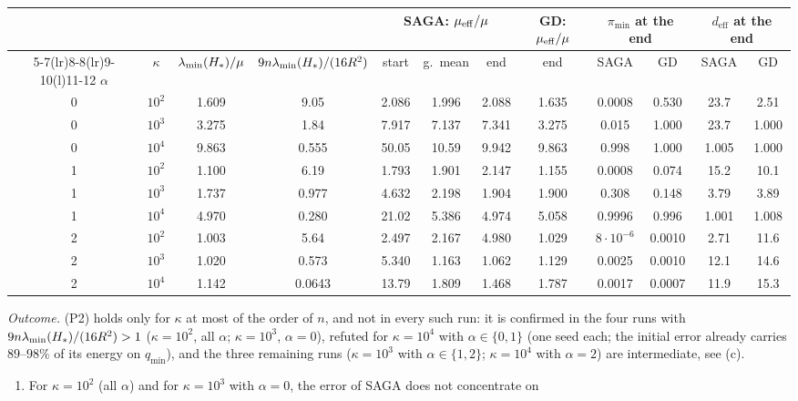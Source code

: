 \begin{remark}
\begin{center}
\footnotesize
\setlength{\tabcolsep}{4pt}
\begin{tabular}{@{}cccccccccccc@{}}
\toprule
 & & & & \multicolumn{3}{c}{SAGA: $\mu_{\mathrm{eff}}/\mu$} & GD: $\mu_{\mathrm{eff}}/\mu$ & \multicolumn{2}{c}{$\pi_{\min}$ at the end} & \multicolumn{2}{c}{$d_{\mathrm{eff}}$ at the end}\\
\cmidrule(lr){5-7}\cmidrule(lr){8-8}\cmidrule(lr){9-10}\cmidrule(l){11-12}
$\alpha$ & $\kappa$ & $\lambda_{\min}(H_\ast)/\mu$ & $9n\lambda_{\min}(H_\ast)/(16R^2)$ & start & g.\ mean & end & end & SAGA & GD & SAGA & GD\\
\midrule
0 & $10^2$ & 1.609 & 9.05 & 2.086 & 1.996 & 2.088 & 1.635 & 0.0008 & 0.530 & 23.7 & 2.51\\
0 & $10^3$ & 3.275 & 1.84 & 7.917 & 7.137 & 7.341 & 3.275 & 0.015 & 1.000 & 23.7 & 1.000\\
0 & $10^4$ & 9.863 & 0.555 & 50.05 & 10.59 & 9.942 & 9.863 & 0.998 & 1.000 & 1.005 & 1.000\\
1 & $10^2$ & 1.100 & 6.19 & 1.793 & 1.901 & 2.147 & 1.155 & 0.0008 & 0.074 & 15.2 & 10.1\\
1 & $10^3$ & 1.737 & 0.977 & 4.632 & 2.198 & 1.904 & 1.900 & 0.308 & 0.148 & 3.79 & 3.89\\
1 & $10^4$ & 4.970 & 0.280 & 21.02 & 5.386 & 4.974 & 5.058 & 0.9996 & 0.996 & 1.001 & 1.008\\
2 & $10^2$ & 1.003 & 5.64 & 2.497 & 2.167 & 4.980 & 1.029 & $8\cdot10^{-6}$ & 0.0010 & 2.71 & 11.6\\
2 & $10^3$ & 1.020 & 0.573 & 5.340 & 1.163 & 1.062 & 1.129 & 0.0025 & 0.0010 & 12.1 & 14.6\\
2 & $10^4$ & 1.142 & 0.0643 & 13.79 & 1.809 & 1.468 & 1.787 & 0.0017 & 0.0007 & 11.9 & 15.3\\
\bottomrule
\end{tabular}
\end{center}
\emph{Outcome.} (P2) holds only for $\kappa$ at most of the order of $n$, and not in every such run: it is confirmed in
the four runs with $9n\lambda_{\min}(H_\ast)/(16R^2)>1$ ($\kappa=10^2$, all $\alpha$; $\kappa=10^3$, $\alpha=0$), refuted for
$\kappa=10^4$ with $\alpha\in\{0,1\}$ (one seed each; the initial error already carries $89$--$98\%$ of its energy on
$q_{\min}$), and the three remaining runs ($\kappa=10^3$ with $\alpha\in\{1,2\}$; $\kappa=10^4$ with $\alpha=2$) are
intermediate, see (c).
\begin{enumerate}[label=(\alph*),leftmargin=*,topsep=2pt,itemsep=1pt]
\item For $\kappa=10^2$ (all $\alpha$) and for $\kappa=10^3$ with $\alpha=0$, the error of SAGA does not concentrate on

\end{enumerate}
\end{remark}
